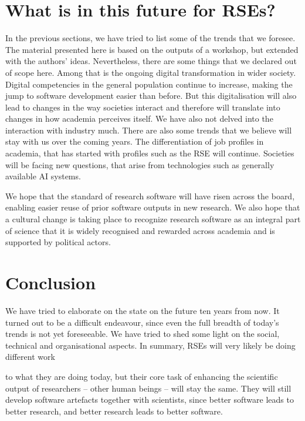 \documentclass{eceasst}
\begin{document}
\section{What is in this future for RSEs?}
In the previous sections, we have tried to list some of the trends that we foresee.
The material presented here is based on the outputs of a workshop, but extended with the authors' ideas.
Nevertheless, there are some things that we declared out of scope here.
Among that is the ongoing digital transformation in wider society.
Digital competencies in the general population continue to increase, making the jump to software development easier than before.
But this digitalisation will also lead to changes in the way societies interact and therefore will translate into changes in how academia perceives itself.
We have also not delved into the interaction with industry much.
There are also some trends that we believe will stay with us over the coming years.
The differentiation of job profiles in academia, that has started with profiles such as the RSE will continue.
Societies will be facing new questions, that arise from technologies such as generally available AI systems.

We hope that the standard of research software will have risen across the board, enabling easier reuse of prior software outputs in new research.
We also hope that a cultural change is taking place to recognize research software as an integral part of science that it is
widely recognised and rewarded across academia and is supported by political actors.
\section{Conclusion}
We have tried to elaborate on the state on the future ten years from now.
It turned out to be a difficult endeavour, since even the full breadth of today's trends is not yet foreseeable.
We have tried to shed some light on the social, technical and organisational aspects.
In summary, RSEs will very likely be doing different work

to what they are doing today, but their core task of enhancing the scientific output of researchers -- other human
beings -- will stay the same.
They will still develop software artefacts together with scientists,
since better software leads to better research,
and better research leads to better software.
\end{document}
